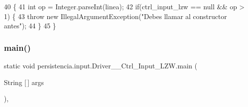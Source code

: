 \begin{DoxyCode}
40                                                                                         \{
41         \textcolor{keywordtype}{int} op = Integer.parseInt(linea);
42         \textcolor{keywordflow}{if}(ctrl\_input\_lzw == null && op > 1) \{
43             \textcolor{keywordflow}{throw} \textcolor{keyword}{new} IllegalArgumentException(\textcolor{stringliteral}{"Debes llamar al constructor antes"});
44         \}
45     \}
\end{DoxyCode}
\mbox{\label{classpersistencia_1_1input_1_1Driver____Ctrl__Input__LZW_a157252ceaf7ec257685654b5ad78049f}} 
\subsubsection{\texorpdfstring{main()}{main()}}
{\footnotesize\ttfamily static void persistencia.\+input.\+Driver\+\_\+\+\_\+\+Ctrl\+\_\+\+Input\+\_\+\+L\+Z\+W.\+main (\begin{DoxyParamCaption}\item[{String \mbox{[}$\,$\mbox{]}}]{args }\end{DoxyParamCaption})\hspace{0.3cm}{\ttfamily [inline]}, {\ttfamily [static]}}



